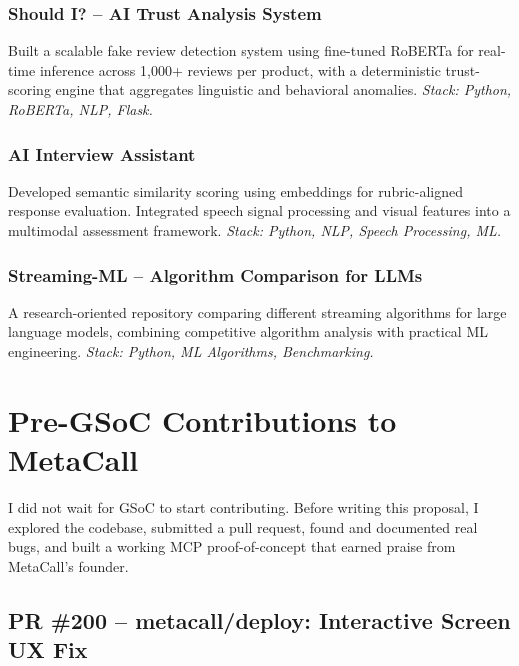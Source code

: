 \documentclass[12pt, a4paper]{article}
\begin{document}
\subsubsection{Should I? -- AI Trust Analysis System}

Built a scalable fake review detection system using fine-tuned RoBERTa
for real-time inference across 1,000+ reviews per product, with a
deterministic trust-scoring engine that aggregates linguistic and
behavioral anomalies.
\textit{Stack: Python, RoBERTa, NLP, Flask.}

\subsubsection{AI Interview Assistant}

Developed semantic similarity scoring using embeddings for rubric-aligned
response evaluation. Integrated speech signal processing and visual
features into a multimodal assessment framework.
\textit{Stack: Python, NLP, Speech Processing, ML.}

\subsubsection{Streaming-ML -- Algorithm Comparison for LLMs}

A research-oriented repository comparing different streaming algorithms
for large language models, combining competitive algorithm analysis with
practical ML engineering.
\textit{Stack: Python, ML Algorithms, Benchmarking.}

\newpage
\section{Pre-GSoC Contributions to MetaCall}

\begin{highlightbox}
I did not wait for GSoC to start contributing. Before writing this
proposal, I explored the codebase, submitted a pull request, found and
documented real bugs, and built a working MCP proof-of-concept that
earned praise from MetaCall's founder.
\end{highlightbox}

\subsection{PR \#200 -- metacall/deploy: Interactive Screen UX Fix}
\end{document}
